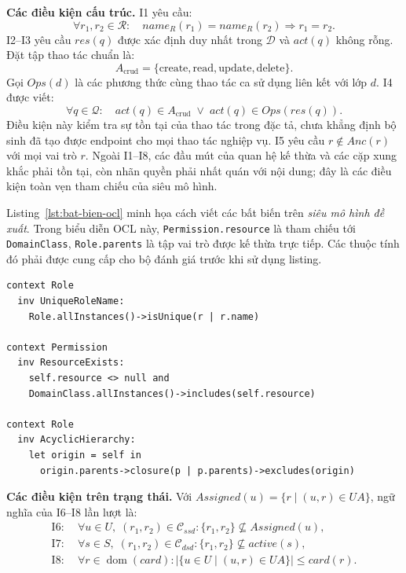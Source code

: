 \textbf{Các điều kiện cấu trúc.} I1 yêu cầu:
\[
\forall r_1,r_2\in\mathcal{R}:\quad
\mathit{name}_{R}(r_1)=\mathit{name}_{R}(r_2)\Rightarrow r_1=r_2.
\]
I2--I3 yêu cầu $\mathit{res}(q)$ được xác định duy nhất trong $\mathcal{D}$ và $\mathit{act}(q)$ không rỗng. Đặt tập thao tác chuẩn là:
\[
A_{\mathrm{crud}}=\{\mathrm{create},\mathrm{read},\mathrm{update},\mathrm{delete}\}.
\]
Gọi $\mathit{Ops}(d)$ là các phương thức cùng thao tác ca sử dụng liên kết với lớp $d$. I4 được viết:
\[
\forall q\in\mathcal{Q}:\quad
\mathit{act}(q)\in A_{\mathrm{crud}}
\;\lor\;
\mathit{act}(q)\in\mathit{Ops}(\mathit{res}(q)).
\]
Điều kiện này kiểm tra sự tồn tại của thao tác trong đặc tả, chưa khẳng định bộ sinh đã tạo được endpoint cho mọi thao tác nghiệp vụ. I5 yêu cầu $r\notin\mathit{Anc}(r)$ với mọi vai trò $r$. Ngoài I1--I8, các đầu mút của quan hệ kế thừa và các cặp xung khắc phải tồn tại, còn nhãn quyền phải nhất quán với nội dung; đây là các điều kiện toàn vẹn tham chiếu của siêu mô hình.

Listing~\ref{lst:bat-bien-ocl} minh họa cách viết các bất biến trên \emph{siêu mô hình đề xuất}. Trong biểu diễn OCL này, \texttt{Permission.resource} là tham chiếu tới \texttt{DomainClass}, \texttt{Role.parents} là tập vai trò được kế thừa trực tiếp. Các thuộc tính đó phải được cung cấp cho bộ đánh giá trước khi sử dụng listing.

\begin{lstlisting}[language=OCL,caption={OCL minh họa I1, I3 và I5 trên siêu mô hình đề xuất},label={lst:bat-bien-ocl}]
context Role
  inv UniqueRoleName:
    Role.allInstances()->isUnique(r | r.name)

context Permission
  inv ResourceExists:
    self.resource <> null and
    DomainClass.allInstances()->includes(self.resource)

context Role
  inv AcyclicHierarchy:
    let origin = self in
      origin.parents->closure(p | p.parents)->excludes(origin)
\end{lstlisting}

\textbf{Các điều kiện trên trạng thái.} Với $\mathit{Assigned}(u)=\{r\mid(u,r)\in UA\}$, ngữ nghĩa của I6--I8 lần lượt là:
\begin{align*}
\mathrm{I6}:\;&
\forall u\in U,\;(r_1,r_2)\in\mathcal{C}_{\mathit{ssd}}:
\{r_1,r_2\}\nsubseteq\mathit{Assigned}(u),\\
\mathrm{I7}:\;&
\forall s\in S,\;(r_1,r_2)\in\mathcal{C}_{\mathit{dsd}}:
\{r_1,r_2\}\nsubseteq\mathit{active}(s),\\
\mathrm{I8}:\;&
\forall r\in\operatorname{dom}(\mathit{card}):
|\{u\in U\mid(u,r)\in UA\}|\leq\mathit{card}(r).
\end{align*}

